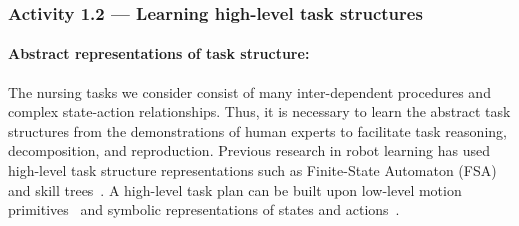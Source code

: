 \documentclass[letterpaper, 11 pt, onecolumn]{article}
\newcommand{\zhi}[1]{\textcolor{blue}{ZL: #1}}
\newcommand{\jie}[1]{\textcolor{green}{JF: #1}}
\begin{document}










\subsubsection{Activity 1.2 --- Learning high-level task structures}\label{sec:plan-motion-high}

\paragraph*{Abstract representations of task structure:} The nursing tasks we consider consist of many inter-dependent procedures and complex state-action relationships. Thus, it is necessary to learn the abstract task structures from the demonstrations of human experts to facilitate task reasoning, decomposition, and reproduction. Previous research in robot learning has used high-level task structure representations such as Finite-State Automaton (FSA)~\cite{niekum2013semantically} and skill trees~\cite{konidaris2012robot}. A high-level task plan can be built upon low-level motion primitives~\cite{konidaris2012robot} and symbolic representations of states and actions~\cite{konidaris2018skills}. 
\end{document}
